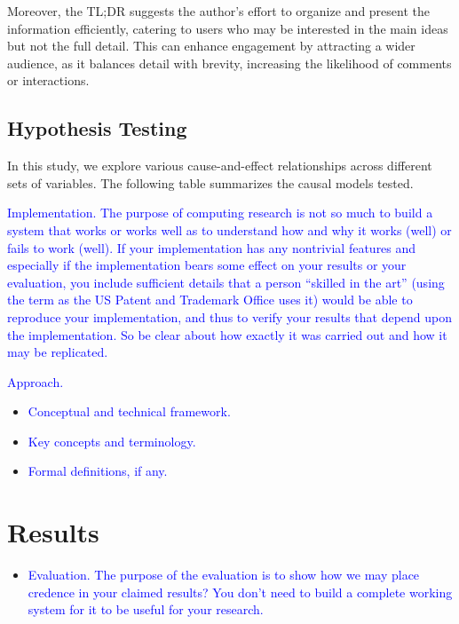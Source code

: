 \documentclass[11pt]{article}
\begin{document}
Moreover, the TL;DR suggests the author's effort to organize and present the information efficiently, catering to users who may be interested in the main ideas but not the full detail. This can enhance engagement by attracting a wider audience, as it balances detail with brevity, increasing the likelihood of comments or interactions.

\subsection{Hypothesis Testing}

In this study, we explore various cause-and-effect relationships across different sets of variables. The following table summarizes the causal models tested.

\textcolor{blue}{Implementation. The purpose of computing research is not so much to build a system that works or works well as to understand how and why it works (well) or fails to work (well). If your implementation has any nontrivial features and especially if the implementation bears some effect on your results or your evaluation, you include sufficient details that a person ``skilled in the art'' (using the term as the US Patent and Trademark Office uses it) would be able to reproduce your implementation, and thus to verify your results that depend upon the implementation. So be clear about how exactly it was carried out and how it may be replicated.}


\textcolor{blue}{Approach.}
\begin{itemize}
    \item \textcolor{blue}{Conceptual and technical framework.}
    \item \textcolor{blue}{Key concepts and terminology.}
    \item \textcolor{blue}{Formal definitions, if any.}
\end{itemize}

\section{Results}

\begin{itemize}
    \item \textcolor{blue}{Evaluation. The purpose of the evaluation is to show how we may place credence in your claimed results? You don't need to build a complete working system for it to be useful for your research.}
\end{itemize}
\end{document}
